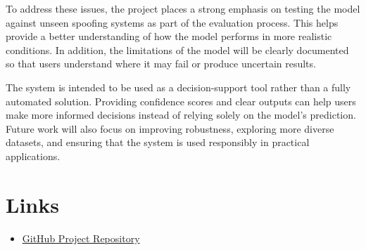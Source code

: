 \documentclass[conference]{IEEEtran}
\begin{document}
To address these issues, the project places a strong emphasis
on testing the model against unseen spoofing systems as
part of the evaluation process. This helps provide a better
understanding of how the model performs in more realistic
conditions. In addition, the limitations of the model will be
clearly documented so that users understand where it may fail
or produce uncertain results.

The system is intended to be used as a decision-support tool
rather than a fully automated solution. Providing confidence
scores and clear outputs can help users make more informed
decisions instead of relying solely on the model’s prediction.
Future work will also focus on improving robustness, exploring
more diverse datasets, and ensuring that the system is used
responsibly in practical applications.



\section*{Links}
\begin{itemize}
    \item \href{https://github.com/Josht8601/voice-spoofing-detection.git}{GitHub Project Repository}
\end{itemize}
\end{document}
